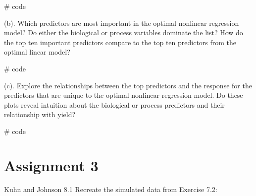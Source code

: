 \documentclass[openany]{report}
\newenvironment{Shaded}{\begin{snugshade}}{\end{snugshade}}
\newcommand{\CommentTok}[1]{\textcolor[rgb]{0.50,0.62,0.50}{#1}}
\newcommand{\DataTypeTok}[1]{\textcolor[rgb]{0.87,0.87,0.75}{#1}}
\newcommand{\DecValTok}[1]{\textcolor[rgb]{0.86,0.86,0.80}{#1}}
\newcommand{\KeywordTok}[1]{\textcolor[rgb]{0.94,0.87,0.69}{#1}}
\newcommand{\NormalTok}[1]{\textcolor[rgb]{0.80,0.80,0.80}{#1}}
\newcommand{\OperatorTok}[1]{\textcolor[rgb]{0.94,0.94,0.82}{#1}}
\newcommand{\StringTok}[1]{\textcolor[rgb]{0.80,0.58,0.58}{#1}}
\begin{document}
\begin{Shaded}
\begin{Highlighting}[]
\CommentTok{# code}
\end{Highlighting}
\end{Shaded}

\begin{subquestion}{(b).}
Which predictors are most important in the optimal nonlinear regression model? Do either the biological or process variables dominate the list? How do the top ten important predictors compare to the top ten predictors from the optimal linear model? 
\end{subquestion}

\begin{Shaded}
\begin{Highlighting}[]
\CommentTok{# code}
\end{Highlighting}
\end{Shaded}

\begin{subquestion}{(c).}
Explore the relationships between the top predictors and the response for the predictors that are unique to the optimal nonlinear regression model. Do these plots reveal intuition about the biological or process predictors and their relationship with yield?
\end{subquestion}

\begin{Shaded}
\begin{Highlighting}[]
\CommentTok{# code}
\end{Highlighting}
\end{Shaded}

\hypertarget{AS-3}{%
\chapter*{Assignment 3}\label{AS-3}}


\begin{question}{Kuhn and Johnson 8.1} Recreate the simulated data from Exercise 7.2: \end{question}

\begin{Shaded}
\end{Shaded}
\end{document}
